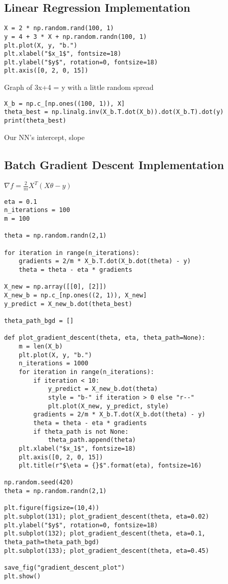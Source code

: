 \documentclass[article]{llncs}
\begin{document}
\subsection{Linear Regression Implementation}
\begin{verbatim}
X = 2 * np.random.rand(100, 1)
y = 4 + 3 * X + np.random.randn(100, 1)
plt.plot(X, y, "b.")
plt.xlabel("$x_1$", fontsize=18)
plt.ylabel("$y$", rotation=0, fontsize=18)
plt.axis([0, 2, 0, 15])
\end{verbatim}
Graph of 3x+4 = y with a little random spread
\begin{verbatim}
X_b = np.c_[np.ones((100, 1)), X]
theta_best = np.linalg.inv(X_b.T.dot(X_b)).dot(X_b.T).dot(y)
print(theta_best)
\end{verbatim}
Our NN's {intercept, slope}
\subsection{Batch Gradient Descent Implementation}
$\nabla f = \frac{2}{m} X^T (X\theta - y) $\\
\begin{verbatim}
eta = 0.1 
n_iterations = 100
m = 100

theta = np.random.randn(2,1) 

for iteration in range(n_iterations):
    gradients = 2/m * X_b.T.dot(X_b.dot(theta) - y)
    theta = theta - eta * gradients

X_new = np.array([[0], [2]])
X_new_b = np.c_[np.ones((2, 1)), X_new]
y_predict = X_new_b.dot(theta_best)

theta_path_bgd = []

def plot_gradient_descent(theta, eta, theta_path=None):
    m = len(X_b)
    plt.plot(X, y, "b.")
    n_iterations = 1000
    for iteration in range(n_iterations):
        if iteration < 10:   
            y_predict = X_new_b.dot(theta)
            style = "b-" if iteration > 0 else "r--"
            plt.plot(X_new, y_predict, style)
        gradients = 2/m * X_b.T.dot(X_b.dot(theta) - y)
        theta = theta - eta * gradients
        if theta_path is not None:
            theta_path.append(theta)
    plt.xlabel("$x_1$", fontsize=18)
    plt.axis([0, 2, 0, 15])
    plt.title(r"$\eta = {}$".format(eta), fontsize=16)

np.random.seed(420)
theta = np.random.randn(2,1)

plt.figure(figsize=(10,4))
plt.subplot(131); plot_gradient_descent(theta, eta=0.02)
plt.ylabel("$y$", rotation=0, fontsize=18)
plt.subplot(132); plot_gradient_descent(theta, eta=0.1, theta_path=theta_path_bgd)
plt.subplot(133); plot_gradient_descent(theta, eta=0.45)

save_fig("gradient_descent_plot")
plt.show()
\end{verbatim}
\end{document}
